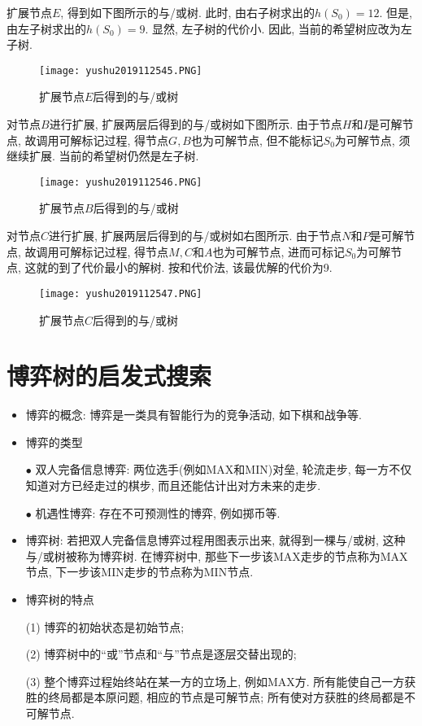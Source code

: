 扩展节点$E$, 得到如下图所示的与/或树.
此时, 由右子树求出的$h(S_0)=12$. 但是, 由左子树求出的$h(S_0)=9$. 显然, 左子树的代价小. 因此, 当前的希望树应改为左子树.
\begin{figure}[H]
    \centering
    \texttt{[image: yushu2019112545.PNG]}
    \caption{扩展节点$E$后得到的与/或树}
    \label{AI32fig45}
\end{figure}
对节点$B$进行扩展, 扩展两层后得到的与/或树如下图所示.
由于节点$H$和$I$是可解节点, 故调用可解标记过程, 得节点$G,B$也为可解节点, 但不能标记$S_0$为可解节点, 须继续扩展. 当前的希望树仍然是左子树.
\begin{figure}[H]
    \centering
    \texttt{[image: yushu2019112546.PNG]}
    \caption{扩展节点$B$后得到的与/或树}
    \label{AI32fig46}
\end{figure}
对节点$C$进行扩展, 扩展两层后得到的与/或树如右图所示.
由于节点$N$和$P$是可解节点, 故调用可解标记过程, 得节点$M,C$和$A$也为可解节点, 进而可标记$S_0$为可解节点, 这就的到了代价最小的解树. 按和代价法, 该最优解的代价为9.
\begin{figure}[H]
    \centering
    \texttt{[image: yushu2019112547.PNG]}
    \caption{扩展节点$C$后得到的与/或树}
    \label{AI32fig47}
\end{figure}
\section{博弈树的启发式搜索}
\begin{itemize}
\item 博弈的概念: 博弈是一类具有智能行为的竞争活动, 如下棋和战争等.
\item 博弈的类型

$\bullet$ 双人完备信息博弈: 两位选手(例如MAX和MIN)对垒, 轮流走步, 每一方不仅知道对方已经走过的棋步, 而且还能估计出对方未来的走步.

$\bullet$ 机遇性博弈: 存在不可预测性的博弈, 例如掷币等.
\item 博弈树: 若把双人完备信息博弈过程用图表示出来, 就得到一棵与/或树, 这种与/或树被称为博弈树. 在博弈树中, 那些下一步该MAX走步的节点称为MAX节点, 下一步该MIN走步的节点称为MIN节点.
\item 博弈树的特点

(1) 博弈的初始状态是初始节点;

(2) 博弈树中的“或”节点和“与”节点是逐层交替出现的;

(3) 整个博弈过程始终站在某一方的立场上, 例如MAX方. 所有能使自己一方获胜的终局都是本原问题, 相应的节点是可解节点; 所有使对方获胜的终局都是不可解节点.
\end{itemize}

